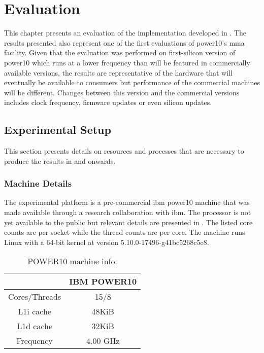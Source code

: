 \documentclass[\main/thesis.tex]{subfiles}
\begin{document}
\chapter{Evaluation}
\label{cha:evaluation}
This chapter presents an evaluation of the implementation developed in .
The results presented also represent one of the first evaluations of \gls{power10}'s \gls{mma} facility.
Given that the evaluation was performed on first-silicon version of \gls{power10} which runs at a lower frequency than will be featured in commercially available versions, the results are representative of the hardware that will eventually be available to consumers but performance of the commercial machines will be different.
Changes between this version and the commercial versions includes clock frequency, firmware updates or even silicon updates.

\section{Experimental Setup}
This section presents details on resources and processes that are necessary to produce the results in  and onwards.

\subsection{Machine Details}
The experimental platform is a pre-commercial \gls{ibm} \gls{power10} machine that was made available through a research collaboration with \gls{ibm}.
The processor is not yet available to the public but relevant details are presented in .
The listed core counts are per socket while the thread counts are per core.
The machine runs Linux with a 64-bit kernel at version 5.10.0-17496-g41bc5268c5e8.

\begin{table}[t]
  \centering
  \begin{tabular}{c | c}
    & IBM POWER10\\\hline
    Cores/Threads & 15/8\\
    L1i cache & 48KiB\\
    L1d cache & 32KiB\\
    Frequency & 4.00 GHz\\
  \end{tabular}
  \caption{POWER10 machine info.}
  \label{tab:machineInfo}
\end{table}
\end{document}
